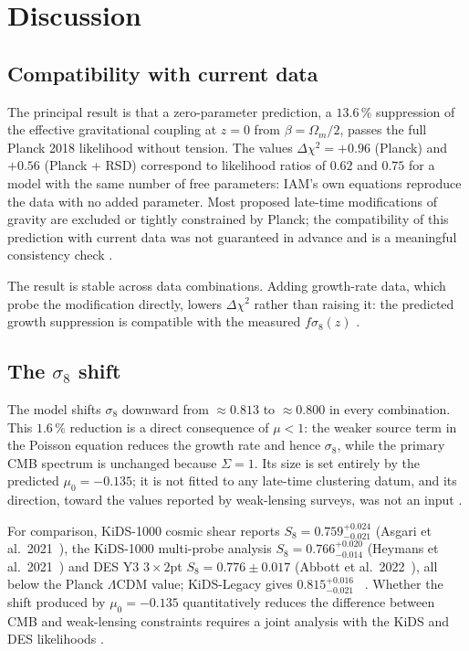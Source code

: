 \section{Discussion}\label{sec:lt_discussion}
\subsection{Compatibility with current data}
The principal result is that a zero-parameter prediction, a $13.6\,\%$ suppression of the effective gravitational coupling at $z=0$ from
$\beta=\Omega_m/2$, passes the full Planck 2018 likelihood without tension. The values $\Delta\chi^2=+0.96$ (Planck) and $+0.56$ (Planck + RSD)
correspond to likelihood ratios of $0.62$ and $0.75$ for a model with the same number of free parameters: IAM's own equations reproduce the data with no added parameter.
Most proposed late-time modifications of gravity are excluded or tightly constrained by Planck; the compatibility of this prediction with current
data was not guaranteed in advance and is a meaningful consistency check \interp.

The result is stable across data combinations. Adding growth-rate data, which probe the modification directly, lowers $\Delta\chi^2$ rather than
raising it: the predicted growth suppression is compatible with the measured $f\sigma_8(z)$ \measured.

\subsection{The $\sigma_8$ shift}
The model shifts $\sigma_8$ downward from $\approx0.813$ to $\approx0.800$ in every combination. This $1.6\,\%$ reduction is a direct consequence of
$\mu<1$: the weaker source term in the Poisson equation reduces the growth rate and hence $\sigma_8$, while the primary CMB spectrum is unchanged
because $\Sigma=1$. Its size is set entirely by the predicted $\mu_0=-0.135$; it is not fitted to any late-time clustering datum, and its
direction, toward the values reported by weak-lensing surveys, was not an input \prediction.

For comparison, KiDS-1000 cosmic shear reports $S_8=0.759^{+0.024}_{-0.021}$ (Asgari et al.\ 2021~\cite{Asgari2021}), the KiDS-1000 multi-probe
analysis $S_8=0.766^{+0.020}_{-0.014}$ (Heymans et al.\ 2021~\cite{Heymans2021}) and DES Y3 $3\times2$pt $S_8=0.776\pm0.017$ (Abbott et al.\
2022~\cite{DESY3}), all below the Planck $\Lambda$CDM value; KiDS-Legacy gives $0.815^{+0.016}_{-0.021}$~\cite{Wright2025} \observed. Whether the
shift produced by $\mu_0=-0.135$ quantitatively reduces the difference between CMB and weak-lensing constraints requires a joint analysis with the
KiDS and DES likelihoods \openprob.

